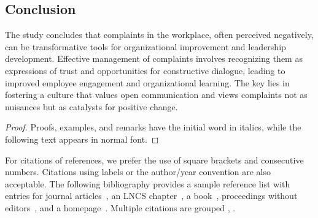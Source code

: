 \documentclass[runningheads]{llncs}
\begin{document}
\subsection{Conclusion}
The study concludes that complaints in the workplace, often perceived negatively, can be transformative tools for organizational improvement and leadership development. Effective management of complaints involves recognizing them as expressions of trust and opportunities for constructive dialogue, leading to improved employee engagement and organizational learning. The key lies in fostering a culture that values open communication and views complaints not as nuisances but as catalysts for positive change.
\newpage
\begin{proof}
Proofs, examples, and remarks have the initial word in italics,
while the following text appears in normal font.
\end{proof}
For citations of references, we prefer the use of square brackets
and consecutive numbers. Citations using labels or the author/year
convention are also acceptable. The following bibliography provides
a sample reference list with entries for journal
articles~\cite{smither2005relationship}, an LNCS chapter~\cite{ref_lncs1}, a
book~\cite{ref_book1}, proceedings without editors~\cite{ref_proc1},
and a homepage~\cite{ref_url1}. Multiple citations are grouped
\cite{ref_article1,ref_lncs1,ref_book1},
\cite{ref_article1,ref_book1,ref_proc1,ref_url1}.

\end{document}
